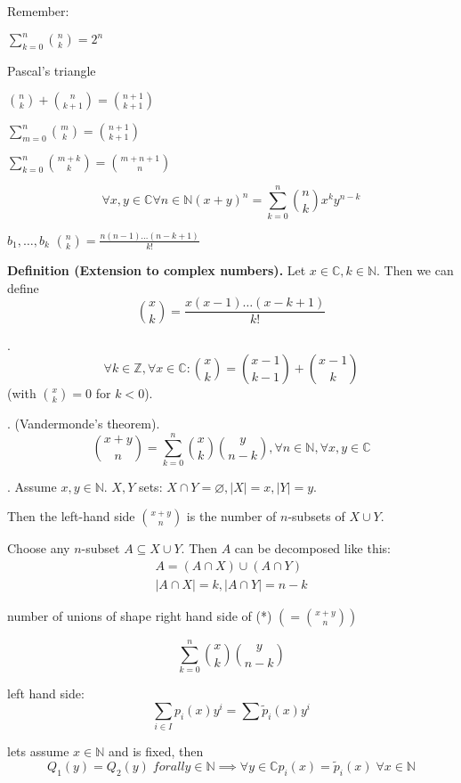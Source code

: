 Remember:
\begin{compactitem}
  \item $\sum_{k=0}^n {n\choose k} = 2^n$
  \item Pascal's triangle
  \item ${n\choose k} + {n\choose k+1} = {n+1 \choose k+1}$
  \item $\sum_{m=0}^n {m\choose k} = {n+1 \choose k+1}$
  \item $\sum_{k=0}^n {m+k \choose k} = {m+n+1 \choose n}$
\end{compactitem}

\[
  \forall x,y\in \mathbb{C}
  \forall n\in \mathbb{N}
  (x+y)^n = \sum_{k=0}^n {n\choose k} x^k y^{n-k}
\]

$b_1, \ldots, b_k$ \; ${n \choose k} = \frac{n(n-1) \ldots (n-k+1)}{k!}$

\textbf{Definition (Extension to complex numbers).}
Let $x\in \mathbb{C}, k\in\mathbb{N}$. Then we can define
\[
  {x\choose k} = \frac{
    x (x-1) \ldots (x-k+1)
  }{
    k!
  }
\]

\Lemma.
\[
  \forall k \in \mathbb{Z}, \forall x\in \mathbb{C}:
  {x\choose k} = {x-1 \choose k-1} + {x-1 \choose k}
\]
(with ${x \choose k} = 0$ for $k < 0$).

\Theorem. (Vandermonde's theorem).
\[
  {x+y \choose n} = \sum_{k=0}^{n} {x\choose k} {y\choose n-k},
  \forall n \in \mathbb{N}, \forall x,y \in \mathbb{C}
\]

\Proof.
Assume $x,y\in \mathbb{N}$. $X,Y$ sets: $X\cap Y=\varnothing, |X|=x, |Y|=y$.

Then the left-hand side
${x+y \choose n}$
is the number of $n$-subsets of $X\cup Y$.

Choose any $n$-subset $A\subseteq X\cup Y$.
Then $A$ can be decomposed like this:
\begin{gather*}
  A = (A\cap X)\cup (A\cap Y) \\
  |A\cap X| = k, |A\cap Y| = n-k
\end{gather*}

number of unions of shape right hand side of (*) $\left(={x+y \choose n} \right)$

\[
  \sum_{k=0}^n {x\choose k} {y\choose n-k}
\]

left hand side: 
\[
  \sum_{i\in I} p_i (x) y^i
  = \sum \widetilde p_i (x) y^i
\]

lets assume $x\in \mathbb{N}$ and is fixed, then
\[
  Q_1(y) = Q_2(y) \; forall y \in \mathbb{N} 
  \implies \forall y\in \mathbb{C}
  p_i(x) = \widetilde p_i(x) \; \forall x \in \mathbb{N}
\]

